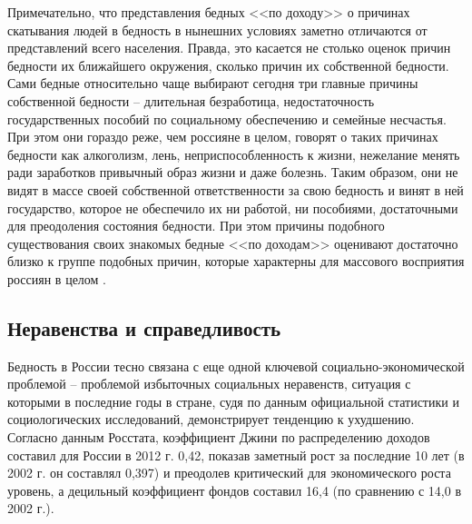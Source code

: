 Примечательно, что представления бедных <<по доходу>> о причинах скатывания 
людей в бедность в нынешних условиях заметно отличаются от представлений всего 
населения. Правда, это касается не столько оценок причин бедности их 
ближайшего окружения, сколько причин их собственной бедности. Сами бедные 
относительно чаще выбирают сегодня три главные причины собственной бедности -- 
длительная безработица, недостаточность государственных пособий по социальному 
обеспечению и семейные несчастья. При этом они гораздо реже, чем россияне в 
целом, говорят о таких причинах бедности как алкоголизм, лень, 
неприспособленность к жизни, нежелание менять ради заработков привычный образ 
жизни и даже болезнь. Таким образом, они не видят в массе своей собственной 
ответственности за свою бедность и винят в ней государство, которое не 
обеспечило их ни работой, ни пособиями, достаточными для преодоления состояния 
бедности. При этом причины подобного существования своих знакомых бедные 
<<по доходам>> оценивают достаточно близко к группе подобных причин, которые 
характерны для массового восприятия россиян в целом \cite{vestnik}.

\subsection{Неравенства и справедливость}
Бедность в России тесно связана с еще одной ключевой социально-экономической 
проблемой -- проблемой избыточных социальных неравенств, ситуация с которыми в 
последние годы в стране, судя по данным официальной статистики и 
социологических исследований, демонстрирует тенденцию к ухудшению. Согласно 
данным Росстата, коэффициент Джини по распределению доходов составил для 
России в 2012 г. 0,42, показав заметный рост за последние 10 лет (в 2002 г. 
он составлял 0,397) и преодолев критический для экономического роста 
уровень\footnotemark[1], а децильный коэффициент фондов составил 16,4 (по 
сравнению с 14,0 в 2002 г.)\footnotemark[2].


